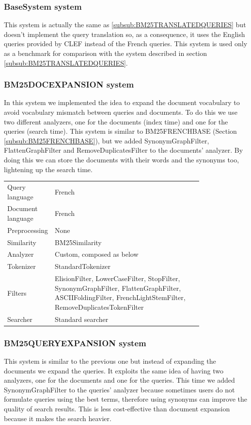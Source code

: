 \subsubsection{BaseSystem system}
\label{subsub:BaseSystem}
This system is actually the same as \ref{subsub:BM25TRANSLATEDQUERIES} but doesn't implement the query translation so, as a consequence, it uses the English queries provided by CLEF instead of the French queries. This system is used only as a benchmark for comparison with the system described in section \ref{subsub:BM25TRANSLATEDQUERIES}.

\subsubsection{BM25DOCEXPANSION system}
In this system we implemented the idea to expand the document vocabulary to avoid vocabulary mismatch between queries and documents. To do this we use two different analyzers, one for the documents (index time) and one for the queries (search time). This system is similar to BM25FRENCHBASE (Section \ref{subsub:BM25FRENCHBASE}), but we added SynonymGraphFilter, FlattenGraphFilter and RemoveDuplicatesFilter to the documents' analyzer. By doing this we can store the documents with their words and the synonyms too, lightening up the search time.

\begin{table}[h!]
    \centering
    \begin{tabular}{l p{0.8\linewidth}}
    Query language & French\\
    Document language & French\\
    Preprocessing & None\\
    Similarity & BM25Similarity\\
    Analyzer & Custom, composed as below\\
    Tokenizer & StandardTokenizer\\
    Filters & ElisionFilter, LowerCaseFilter, StopFilter, SynonymGraphFilter, FlattenGraphFilter, ASCIIFoldingFilter, FrenchLightStemFilter, RemoveDuplicatesTokenFilter\\
    Searcher & Standard searcher
    \end{tabular}
\end{table}

\subsubsection{BM25QUERYEXPANSION system}
This system is similar to the previous one but instead of expanding the documents we expand the queries. It exploits the same idea of having two analyzers, one for the documents and one for the queries. This time we added SynonymGraphFilter to the queries' analyzer because sometimes users do not formulate queries using the best terms, therefore using synonyms can improve the quality of search results. This is less cost-effective than document expansion because it makes the search heavier.

